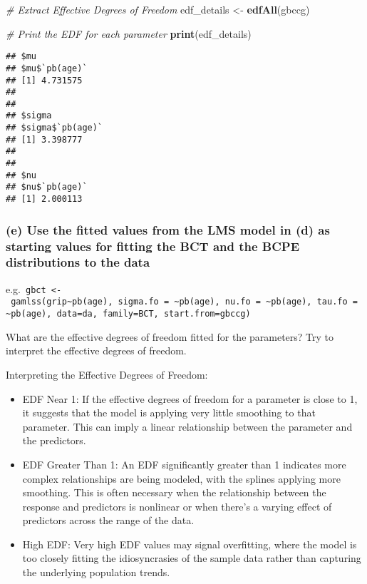 \documentclass[
]{article}
\newenvironment{Shaded}{\begin{snugshade}}{\end{snugshade}}
\newcommand{\CommentTok}[1]{\textcolor[rgb]{0.56,0.35,0.01}{\textit{#1}}}
\newcommand{\FunctionTok}[1]{\textcolor[rgb]{0.13,0.29,0.53}{\textbf{#1}}}
\newcommand{\NormalTok}[1]{#1}
\newcommand{\OtherTok}[1]{\textcolor[rgb]{0.56,0.35,0.01}{#1}}
\begin{document}
\begin{Shaded}
\begin{Highlighting}[]
\CommentTok{\# Extract Effective Degrees of Freedom}
\NormalTok{edf\_details }\OtherTok{\textless{}{-}} \FunctionTok{edfAll}\NormalTok{(gbccg)}

\CommentTok{\# Print the EDF for each parameter}
\FunctionTok{print}\NormalTok{(edf\_details)}
\end{Highlighting}
\end{Shaded}

\begin{verbatim}
## $mu
## $mu$`pb(age)`
## [1] 4.731575
## 
## 
## $sigma
## $sigma$`pb(age)`
## [1] 3.398777
## 
## 
## $nu
## $nu$`pb(age)`
## [1] 2.000113
\end{verbatim}

\hypertarget{e-use-the-fitted-values-from-the-lms-model-in-d-as-starting-values-for-fitting-the-bct-and-the-bcpe-distributions-to-the-data}{%
\subsubsection{(e) Use the fitted values from the LMS model in (d) as
starting values for fitting the BCT and the BCPE distributions to the
data}\label{e-use-the-fitted-values-from-the-lms-model-in-d-as-starting-values-for-fitting-the-bct-and-the-bcpe-distributions-to-the-data}}

e.g.~\texttt{gbct\ \textless{}-\ gamlss(grip\textasciitilde{}pb(age),\ sigma.fo\ =\ \textasciitilde{}pb(age),\ nu.fo\ =\ \textasciitilde{}pb(age),\ tau.fo\ =\ \textasciitilde{}pb(age),\ data=da,\ family=BCT,\ start.from=gbccg)}

What are the effective degrees of freedom fitted for the parameters? Try
to interpret the effective degrees of freedom.

Interpreting the Effective Degrees of Freedom:

\begin{itemize}
\item
  EDF Near 1: If the effective degrees of freedom for a parameter is
  close to 1, it suggests that the model is applying very little
  smoothing to that parameter. This can imply a linear relationship
  between the parameter and the predictors.
\item
  EDF Greater Than 1: An EDF significantly greater than 1 indicates more
  complex relationships are being modeled, with the splines applying
  more smoothing. This is often necessary when the relationship between
  the response and predictors is nonlinear or when there's a varying
  effect of predictors across the range of the data.
\item
  High EDF: Very high EDF values may signal overfitting, where the model
  is too closely fitting the idiosyncrasies of the sample data rather
  than capturing the underlying population trends.
\end{itemize}
\end{document}
